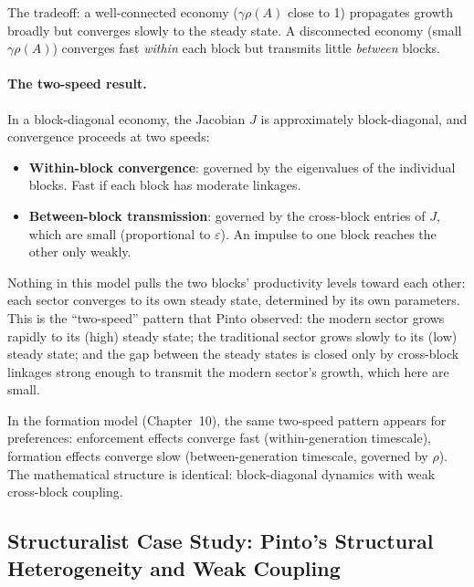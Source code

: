 \documentclass[../structural_economics_book.tex]{subfiles}
\begin{document}
The tradeoff: a well-connected economy ($\gamma\rho(A)$ close to 1) propagates growth broadly but converges slowly to the steady state. A disconnected economy (small $\gamma\rho(A)$) converges fast \textit{within} each block but transmits little \textit{between} blocks.

\paragraph{The two-speed result.} In a block-diagonal economy, the Jacobian $J$ is approximately block-diagonal, and convergence proceeds at two speeds:
\begin{itemize}
\item \textbf{Within-block convergence}: governed by the eigenvalues of the individual blocks. Fast if each block has moderate linkages.
\item \textbf{Between-block transmission}: governed by the cross-block entries of $J$, which are small (proportional to $\varepsilon$). An impulse to one block reaches the other only weakly.
\end{itemize}

Nothing in this model pulls the two blocks' productivity levels toward each other: each sector converges to its own steady state, determined by its own parameters. This is the ``two-speed'' pattern that Pinto observed: the modern sector grows rapidly to its (high) steady state; the traditional sector grows slowly to its (low) steady state; and the gap between the steady states is closed only by cross-block linkages strong enough to transmit the modern sector's growth, which here are small.

In the formation model (Chapter~10), the same two-speed pattern appears for preferences: enforcement effects converge fast (within-generation timescale), formation effects converge slow (between-generation timescale, governed by $\rho$). The mathematical structure is identical: block-diagonal dynamics with weak cross-block coupling.


\subsection*{Structuralist Case Study: Pinto's Structural Heterogeneity and Weak Coupling}
\end{document}

